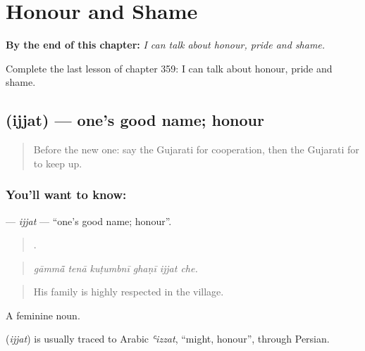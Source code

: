 
\chapter{Honour and Shame}
\label{ch:gu-honour-and-shame}

\begin{chapteropening}
\textbf{By the end of this chapter:} \emph{I can talk about honour, pride and shame.}

Complete the last lesson of chapter 359: I can talk about honour, pride and shame.
\end{chapteropening}

\section[\texorpdfstring{\gu{ઇજ્જત} (ijjat)}{ઇજ્જત (ijjat)}]{ (ijjat) — one's good name; honour}

\label{lesson:GU-C359-ijjat}



\begin{quote}
Before the new one: say the Gujarati for cooperation, then the Gujarati for to keep up.
\end{quote}

\subsection*{You'll want to know: }
\textbf{} — \emph{ijjat} — \textquotedblleft{}one's good name; honour\textquotedblright{}.

\begin{quote}
     .
\end{quote}

\begin{quote}
\emph{gāmmā̃ tenā kuṭumbnī ghaṇī ijjat che.}
\end{quote}

\begin{quote}
His family is highly respected in the village.
\end{quote}

A feminine noun.

\begin{cousinweb}
\textbf{} (\emph{ijjat}) is usually traced to Arabic \emph{ʿizzat}, \textquotedblleft{}might, honour\textquotedblright{}, through Persian.
\end{cousinweb}

